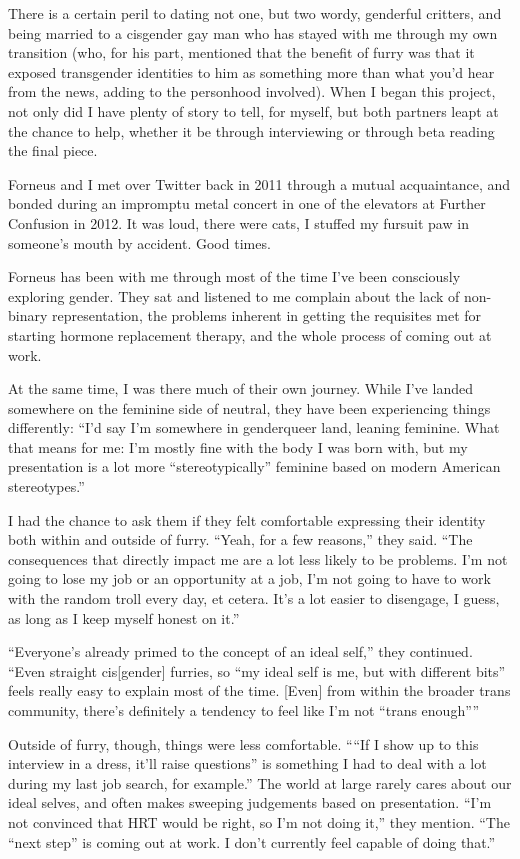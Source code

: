 There is a certain peril to dating not one, but two wordy, genderful critters, and being married to a cisgender gay man who has stayed with me through my own transition (who, for his part, mentioned that the benefit of furry was that it exposed transgender identities to him as something more than what you'd hear from the news, adding to the personhood involved). When I began this project, not only did I have plenty of story to tell, for myself, but both partners leapt at the chance to help, whether it be through interviewing or through beta reading the final piece.

Forneus and I met over Twitter back in 2011 through a mutual acquaintance, and bonded during an impromptu metal concert in one of the elevators at Further Confusion in 2012. It was loud, there were cats, I stuffed my fursuit paw in someone's mouth by accident. Good times.

Forneus has been with me through most of the time I've been consciously exploring gender. They sat and listened to me complain about the lack of non-binary representation, the problems inherent in getting the requisites met for starting hormone replacement therapy, and the whole process of coming out at work.

At the same time, I was there much of their own journey. While I've landed somewhere on the feminine side of neutral, they have been experiencing things differently: ``I'd say I'm somewhere in genderqueer land, leaning feminine. What that means for me: I'm mostly fine with the body I was born with, but my presentation is a lot more ``stereotypically'' feminine based on modern American stereotypes.''

I had the chance to ask them if they felt comfortable expressing their identity both within and outside of furry. ``Yeah, for a few reasons,'' they said. ``The consequences that directly impact me are a lot less likely to be problems. I'm not going to lose my job or an opportunity at a job, I'm not going to have to work with the random troll every day, et cetera. It's a lot easier to disengage, I guess, as long as I keep myself honest on it.''

``Everyone's already primed to the concept of an ideal self,'' they continued. ``Even straight cis{[}gender{]} furries, so ``my ideal self is me, but with different bits'' feels really easy to explain most of the time. {[}Even{]} from within the broader trans community, there's definitely a tendency to feel like I'm not ``trans enough''''

Outside of furry, though, things were less comfortable. ````If I show up to this interview in a dress, it'll raise questions'' is something I had to deal with a lot during my last job search, for example.'' The world at large rarely cares about our ideal selves, and often makes sweeping judgements based on presentation. ``I'm not convinced that HRT would be right, so I'm not doing it,'' they mention. ``The ``next step'' is coming out at work. I don't currently feel capable of doing that.''

